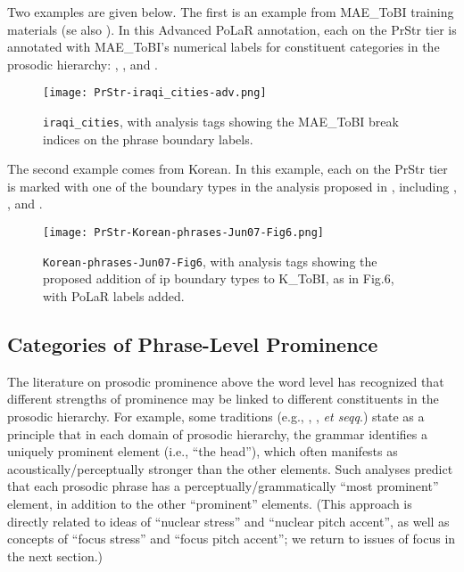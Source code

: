 Two examples are given below. The first is an example from MAE\_ToBI training materials (se also \citealt{beckman-05}). In this Advanced PoLaR annotation, each \textlabel{]} on the PrStr tier is annotated with MAE\_ToBI’s numerical labels for constituent categories in the prosodic hierarchy: , , and .

\begin{figure}[H]
\centering
%
\texttt{[image: PrStr-iraqi\_cities-adv.png]}
%
\caption{\texttt{iraqi\_cities}, with analysis tags showing the MAE\_ToBI break indices on the phrase boundary labels.%
\label{fig:iraqi_cities Beyond}%
}
\end{figure}

The second example comes from Korean.  In this example, each \textlabel{]} on the PrStr tier is marked with one of the boundary types in the analysis proposed in \citealt{jun07}, including \textlabel{]\#AP}, \textlabel{]\#ip}, and \textlabel{]\#IP}.

\begin{figure}[H]
\centering
%
\texttt{[image: PrStr-Korean-phrases-Jun07-Fig6.png]}
%
\caption[\texttt{Korean-phrases-Jun07-Fig6}, with analysis tags.]{\texttt{Korean-phrases-Jun07-Fig6}, with analysis tags showing the proposed addition of ip boundary types to K\_ToBI, as in \citealt{jun07} Fig.6, with PoLaR labels added.%
\label{fig:PrStr-Korean-phrases-Jun07-Fig6}%
}
\end{figure}

\subsection{Categories of Phrase-Level Prominence}\label{sec:categories-of-phrase-level-prominence}

The literature on prosodic prominence above the word level has recognized that different strengths of prominence may be linked to different constituents in the prosodic hierarchy. For example, some traditions (e.g., \citealt{libermanprince77}, \citealt{halle-87}, \textit{et seqq}.) state as a principle that in each domain of prosodic hierarchy, the grammar identifies a uniquely prominent element (i.e., “the head”), which often manifests as acoustically\slash perceptually stronger than the other elements. Such analyses predict that each prosodic phrase has a perceptually\slash grammatically “most prominent” element, in addition to the other “prominent” elements. (This approach is directly related to ideas of “nuclear stress” and “nuclear pitch accent”, as well as concepts of “focus stress” and “focus pitch accent”; we return to issues of focus in the next section.)

